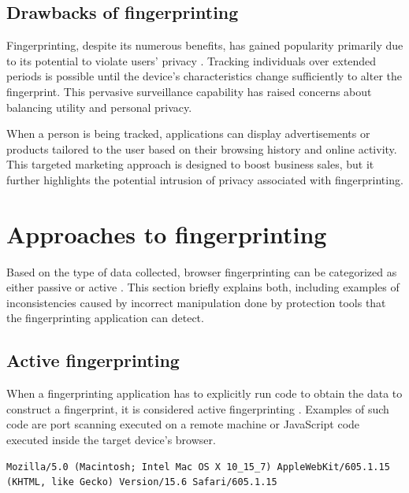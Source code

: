 \subsection{Drawbacks of fingerprinting}

Fingerprinting, despite its numerous benefits, has gained popularity primarily due to its potential to violate users' privacy \cite{WP224Fingerprinting}. Tracking individuals over extended periods is possible until the device's characteristics change sufficiently to alter the fingerprint. This pervasive surveillance capability has raised concerns about balancing utility and personal privacy.

When a person is being tracked, applications can display advertisements or products tailored to the user based on their browsing history and online activity. This targeted marketing approach is designed to boost business sales, but it further highlights the potential intrusion of privacy associated with fingerprinting.

\section{Approaches to fingerprinting}
\label{Section:FingerprintingApproaches}

Based on the type of data collected, browser fingerprinting can be categorized as either passive or active \cite{JShelterPaper}. This section briefly explains both, including examples of inconsistencies caused by incorrect manipulation done by protection tools that the fingerprinting application can detect.

\subsection{Active fingerprinting}

When a fingerprinting application has to explicitly run code to obtain the data to construct a fingerprint, it is considered active fingerprinting \cite{JShelterPaper}. Examples of such code are port scanning executed on a remote machine or JavaScript code executed inside the target device's browser.

\bigbreak

\begin{lstlisting}[caption={An example of Safari User-Agent string.}, label={Listing:UserAgentSafariFingerprinting}]
Mozilla/5.0 (Macintosh; Intel Mac OS X 10_15_7) AppleWebKit/605.1.15 (KHTML, like Gecko) Version/15.6 Safari/605.1.15
\end{lstlisting}

